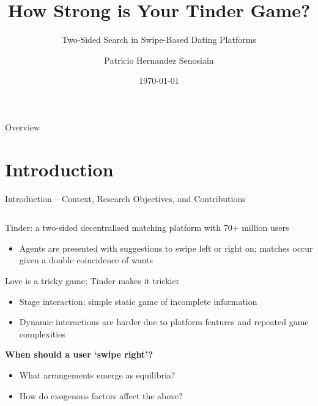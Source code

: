 \documentclass[10pt, aspectratio=169,xcolor=dvipsnames]{beamer}
\title[short title]{How Strong is Your Tinder Game?}
\subtitle{Two-Sided Search in Swipe-Based Dating Platforms}
\author[Patricio Hernandez Senosiain] {Patricio Hernandez Senosiain}
\institute[UofW] 
{
    University of Warwick\\
    EC331 Research in Applied Economics
    \vskip 3pt
}
\date{\today}
\makeatletter
\newenvironment{myitemize}{%
   \setlength{\topsep}{0pt}
   \setlength{\partopsep}{0pt}
   \itemize
}{\enditemize}
\makeatother
\begin{document}
\begin{frame}
    \titlepage
\end{frame}

\begin{frame}{Overview}
    \tableofcontents
\end{frame}

\section{Introduction}
\begin{frame}{Introduction – Context, Research Objectives, and Contributions}
\begin{columns}
\begin{column}{0.5\textwidth}
\begin{myitemize}
\setlength\itemsep{1em}
    \item Tinder: a two-sided decentralised matching platform with 70+ million users
    \begin{itemize} 
    \setlength\itemsep{0.5em} 
        \item Agents are presented with suggestions to swipe left or right on; matches occur given a double coincidence of wants 
    \end{itemize} 
    \item Love is a tricky game; Tinder makes it trickier
    \begin{itemize} 
    \setlength\itemsep{0.5em} 
        \item Stage interaction: simple static game of incomplete information
        \item Dynamic interactions are harder due to platform features and repeated game complexities
    \end{itemize}
    
     
    \item \textbf{When should a user `swipe right'?}
    \begin{itemize}
    \setlength\itemsep{0.5em}
        \item What arrangements emerge as equilibria?
        \item How do exogenous factors affect the above?
    \end{itemize}
\end{myitemize}
\end{column} 


\end{columns}
\end{frame}
\end{document}
